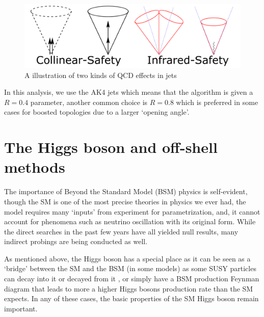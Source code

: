\begin{figure}[htb]
\begin{center}
\includegraphics[width=.85\linewidth]{fig/jet_split.png}
\end{center}
\caption{A illustration of two kinds of QCD effects in jets\protect\footnotemark}
\label{fig:jet_split}
\end{figure}

In this analysis, we use the AK4 jets which means that the algorithm is given a $R=0.4$ parameter, another
common choice is $R=0.8$ which is preferred in some cases for boosted topologies due to a larger `opening
angle'.

\section{The Higgs boson and off-shell methods}\label{sec:physics_offshell}

The importance of Beyond the Standard Model (BSM) physics is self-evident, though the SM is one
of the most precise theories in physics we ever had, the model requires many `inputs' from experiment
for parametrization, and, it cannot account for phenomena such as neutrino oscillation with its
original form. While the direct searches in the past few years have all yielded null results,
many indirect probings are being conducted as well.

As mentioned above, the Higgs boson has a special place as it can be seen as a `bridge' between
the SM and the BSM (in some models) as some SUSY particles can decay into it or decayed from it
, or simply have a BSM production Feynman diagram that leads to more a higher Higgs
bosons production rate than the SM expects. In any of these cases, the basic properties of the SM Higgs
boson remain important.



